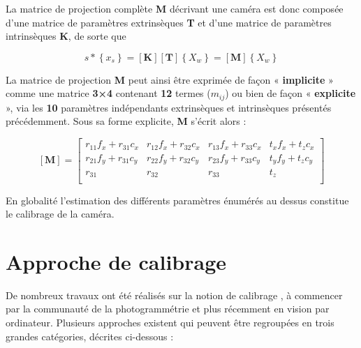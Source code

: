   La matrice de projection complète \textbf{M} décrivant une caméra est donc composée d’une matrice de paramètres extrinsèques \textbf{T} et d’une matrice de paramètres intrinsèques \textbf{K}, de sorte que
  
   \begin{equation}
  s
  *
  \left\{ x_s \right\}
  =
  \left[ \textbf{K} \right] 
  \left[ \textbf{T} \right]
  \left\{ X_w \right\} 
  =
  \left[ \textbf{M} \right]
  \left\{ X_w \right\} 
\end{equation}
  
  La matrice de projection \textbf{M} peut ainsi être exprimée de façon « \textbf{implicite} » comme une matrice \textbf{3×4} contenant \textbf{12} termes ($m_{ij}$) ou bien de façon « \textbf{explicite} », via les \textbf{10} paramètres indépendants extrinsèques et intrinsèques présentés précédemment. Sous sa forme explicite, \textbf{M} s’écrit alors :
  
   \begin{equation}
  \left[ \textbf{M} \right]
  =
  \left[ 
  \begin{array}{cccc}
  	r_{11}f_x + r_{31}c_x & r_{12}f_x + r_{32}c_x & r_{13}f_x + r_{33}c_x & t_xf_x + t_zc_x \\
  	r_{21}f_y + r_{31}c_y & r_{22}f_y + r_{32}c_y & r_{23}f_y + r_{33}c_y & t_yf_y + t_zc_y \\
  	r_{31} & r_{32} & r_{33} & t_z\\
  \end{array}
  \right]
\end{equation}
  
  En globalité l'estimation des différents paramètres énumérés au dessus constitue le calibrage de la caméra.
  
  
  \newpage
  
  \section{Approche de calibrage}
  
  De nombreux travaux ont été réalisés sur la notion de calibrage , à commencer par la communauté de la photogrammétrie et plus récemment en vision par ordinateur.
  Plusieurs approches existent qui peuvent être regroupées en trois grandes catégories, décrites ci-dessous : 
  
